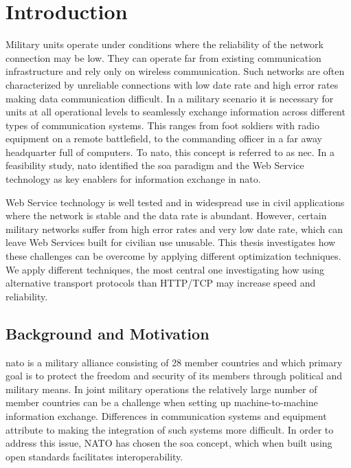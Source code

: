 \chapter{Introduction}

Military units operate under conditions where the reliability of the
network connection may be low. They can operate far from existing communication
infrastructure and rely only on wireless communication. Such networks are
often characterized by unreliable connections with low date rate and high
error rates making data communication difficult. In a military scenario it is
necessary for units at all operational levels to seamlessly exchange
information across different types of communication systems. This ranges from
foot soldiers with radio equipment on a remote battlefield, to the commanding
officer in a far away headquarter full of computers. To \gls{nato}, this
concept is referred to as \gls{nec}. In a feasibility study, \gls{nato}
identified the \gls{soa} paradigm and the Web Service technology as key
enablers for information exchange in \gls{nato}\cite{nnec-study}.

Web Service technology is well tested and in widespread use in civil
applications where the network is stable and the data rate is abundant.
However, certain military networks suffer from high error rates and very low
date rate, which can leave Web Services built for civilian use unusable. This
thesis investigates how these challenges can be overcome by applying  different
optimization techniques. We apply different techniques, the most central one
investigating how using alternative transport protocols than HTTP/TCP may
increase speed and reliability.


\section{Background and Motivation}

\gls{nato} is a military alliance consisting of 28 member countries
\cite{nato-homepage-member-countries} and which primary goal is to protect the
freedom and security of its members through political and military means. In
joint military operations the relatively large number of member countries can be
a challenge when setting up machine-to-machine information exchange. Differences
in communication systems and equipment attribute to making the integration of
such systems more difficult. In order to address this issue, NATO has chosen the
\gls{soa} concept, which when built using open standards facilitates
interoperability\cite{nnec-study}.

